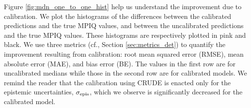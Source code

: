 Figure \ref{fig:mdn_one_to_one_hist} help us understand the improvement due to calibration. We plot the histograms of the differences between the calibrated predictions and the true MPIQ values, and between the uncalibrated predictions and the true MPIQ values.  These histograms are respectively plotted in pink and black. We use three metrics (cf., Section \ref{sec:metrics_det}) to quantify the improvement resulting from calibration: root mean squared error (RMSE), mean absolute error (MAE), and bias error (BE). The values in the first row are for uncalibrated medians while those in the second row are for calibrated models.  We remind the reader that the calibration using CRUDE \citep{crude_probability_calibration} is enacted only for the epistemic uncertainties, $\sigma_{\rm epis}$, which we observe is significantly decreased for the calibrated model.


